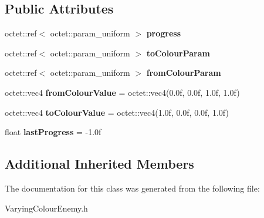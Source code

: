 \subsection*{Public Attributes}
\begin{DoxyCompactItemize}
\item 
\hypertarget{class_arena_1_1_varying_colour_enemy_a8c397205b1fa80e2222f7f0989121962}{octet\+::ref$<$ octet\+::param\+\_\+uniform $>$ {\bfseries progress}}\label{class_arena_1_1_varying_colour_enemy_a8c397205b1fa80e2222f7f0989121962}

\item 
\hypertarget{class_arena_1_1_varying_colour_enemy_a9bdb65fdc9d51b566b5b99e0d2074a5b}{octet\+::ref$<$ octet\+::param\+\_\+uniform $>$ {\bfseries to\+Colour\+Param}}\label{class_arena_1_1_varying_colour_enemy_a9bdb65fdc9d51b566b5b99e0d2074a5b}

\item 
\hypertarget{class_arena_1_1_varying_colour_enemy_a0635e854ec37686a4032d033c0b4f895}{octet\+::ref$<$ octet\+::param\+\_\+uniform $>$ {\bfseries from\+Colour\+Param}}\label{class_arena_1_1_varying_colour_enemy_a0635e854ec37686a4032d033c0b4f895}

\item 
\hypertarget{class_arena_1_1_varying_colour_enemy_af1ca4bc4ce04b5b9895c7fba61855887}{octet\+::vec4 {\bfseries from\+Colour\+Value} = octet\+::vec4(0.\+0f, 0.\+0f, 1.\+0f, 1.\+0f)}\label{class_arena_1_1_varying_colour_enemy_af1ca4bc4ce04b5b9895c7fba61855887}

\item 
\hypertarget{class_arena_1_1_varying_colour_enemy_a072ea76fb5173a674177bace651bfb50}{octet\+::vec4 {\bfseries to\+Colour\+Value} = octet\+::vec4(1.\+0f, 0.\+0f, 0.\+0f, 1.\+0f)}\label{class_arena_1_1_varying_colour_enemy_a072ea76fb5173a674177bace651bfb50}

\item 
\hypertarget{class_arena_1_1_varying_colour_enemy_aa30582a457af561dab765f23a9d8651b}{float {\bfseries last\+Progress} = -\/1.\+0f}\label{class_arena_1_1_varying_colour_enemy_aa30582a457af561dab765f23a9d8651b}

\end{DoxyCompactItemize}
\subsection*{Additional Inherited Members}


The documentation for this class was generated from the following file\+:\begin{DoxyCompactItemize}
\item 
Varying\+Colour\+Enemy.\+h\end{DoxyCompactItemize}
